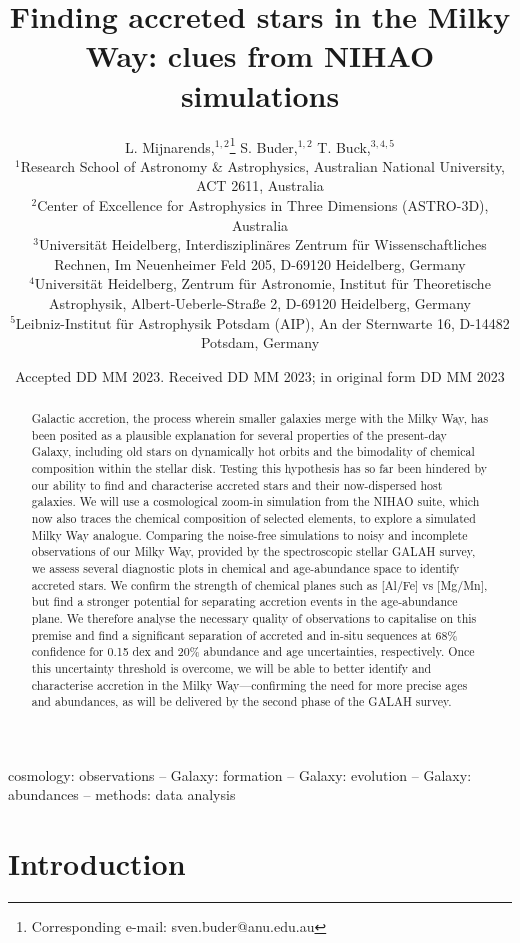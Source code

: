 \documentclass[fleqn,usenatbib]{mnras}
\title[Accreted stars in NIHAO and GALAH]{Finding accreted stars in the Milky Way: clues from NIHAO simulations}
\author[L. Mijnarends, S. Buder and T. Buck]{
L. Mijnarends,$^{1,2}$\thanks{Corresponding e-mail: sven.buder@anu.edu.au}
S. Buder,$^{1,2}$
T. Buck,$^{3,4,5}$
\\
$^{1}$Research School of Astronomy \& Astrophysics, Australian National University, ACT 2611, Australia\\
$^{2}$Center of Excellence for Astrophysics in Three Dimensions (ASTRO-3D), Australia\\
$^{3}$Universit{\"a}t Heidelberg, Interdisziplin{\"a}res Zentrum f{\"u}r Wissenschaftliches Rechnen, Im Neuenheimer Feld 205, D-69120 Heidelberg, Germany\\
$^{4}$Universit{\"a}t Heidelberg, Zentrum f{\"u}r Astronomie, Institut f{\"u}r Theoretische Astrophysik, Albert-Ueberle-Straße 2, D-69120 Heidelberg, Germany\\
$^{5}$Leibniz-Institut f{\"u}r Astrophysik Potsdam (AIP), An der Sternwarte 16, D-14482 Potsdam, Germany
}
\date{Accepted DD MM 2023. Received DD MM 2023; in original form DD MM 2023}
\begin{document}
\label{firstpage}
\pagerange{\pageref{firstpage}--\pageref{lastpage}}
\maketitle

\begin{abstract}
Galactic accretion, the process wherein smaller galaxies merge with the Milky Way, has been posited as a plausible explanation for several properties of the present-day Galaxy, including old stars on dynamically hot orbits and the bimodality of chemical composition within the stellar disk. Testing this hypothesis has so far been hindered by our ability to find and characterise accreted stars and their now-dispersed host galaxies. We will use a cosmological zoom-in simulation from the NIHAO suite, which now also traces the chemical composition of selected elements, to explore a simulated Milky Way analogue. Comparing the noise-free simulations to noisy and incomplete observations of our Milky Way, provided by the spectroscopic stellar GALAH survey, we assess several diagnostic plots in chemical and age-abundance space to identify accreted stars. We confirm the strength of chemical planes such as [Al/Fe] vs [Mg/Mn], but find a stronger potential for separating accretion events in the age-abundance plane. We therefore analyse the necessary quality of observations to capitalise on this premise and find a significant separation of accreted and in-situ sequences at 68\% confidence for 0.15 dex and 20\% abundance and age uncertainties, respectively. Once this uncertainty threshold is overcome, we will be able to better identify and characterise accretion in the Milky Way—confirming the need for more precise ages and abundances, as will be delivered by the second phase of the GALAH survey. 
\end{abstract}
\begin{keywords}
cosmology: observations -- Galaxy: formation -- Galaxy: evolution -- Galaxy: abundances -- methods: data analysis
\end{keywords}



\section{Introduction}
\label{sec:intro}
\end{document}
